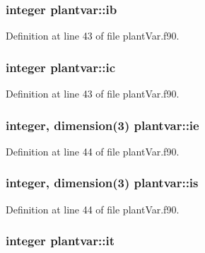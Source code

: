 \hypertarget{classplantvar_a1ee94e03e80cea12dff918a70f1a7993}{
\subsubsection[{ib}]{\setlength{\rightskip}{0pt plus 5cm}integer plantvar\-::ib}}\label{classplantvar_a1ee94e03e80cea12dff918a70f1a7993}


Definition at line 43 of file plant\-Var.\-f90.

\hypertarget{classplantvar_ad912cbd511b056bee83744eefe0c0ef8}{
\subsubsection[{ic}]{\setlength{\rightskip}{0pt plus 5cm}integer plantvar\-::ic}}\label{classplantvar_ad912cbd511b056bee83744eefe0c0ef8}


Definition at line 43 of file plant\-Var.\-f90.

\hypertarget{classplantvar_a9a1a47dc2865d900ce5834934d4c6c06}{
\subsubsection[{ie}]{\setlength{\rightskip}{0pt plus 5cm}integer, dimension(3) plantvar\-::ie}}\label{classplantvar_a9a1a47dc2865d900ce5834934d4c6c06}


Definition at line 44 of file plant\-Var.\-f90.

\hypertarget{classplantvar_add18a489fead102059c74cf8875f94e0}{
\subsubsection[{is}]{\setlength{\rightskip}{0pt plus 5cm}integer, dimension(3) plantvar\-::is}}\label{classplantvar_add18a489fead102059c74cf8875f94e0}


Definition at line 44 of file plant\-Var.\-f90.

\hypertarget{classplantvar_a05f1670af399c966c49b07aa825f279e}{
\subsubsection[{it}]{\setlength{\rightskip}{0pt plus 5cm}integer plantvar\-::it}}\label{classplantvar_a05f1670af399c966c49b07aa825f279e}


